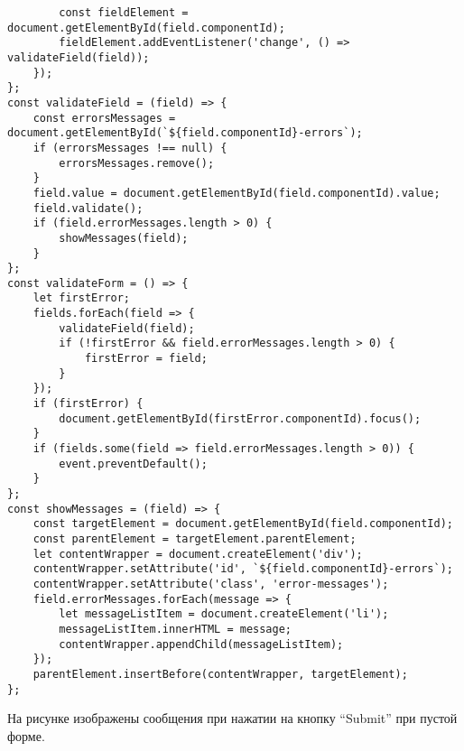 \documentclass[a4paper,14pt]{extarticle}
\begin{document}
\begin{lstlisting}
        const fieldElement = document.getElementById(field.componentId);
        fieldElement.addEventListener('change', () => validateField(field));
    });
};
const validateField = (field) => {
    const errorsMessages = document.getElementById(`${field.componentId}-errors`);
    if (errorsMessages !== null) {
        errorsMessages.remove();
    }
    field.value = document.getElementById(field.componentId).value;
    field.validate();
    if (field.errorMessages.length > 0) {
        showMessages(field);
    }
};
const validateForm = () => {
    let firstError;
    fields.forEach(field => {
        validateField(field);
        if (!firstError && field.errorMessages.length > 0) {
            firstError = field;
        }
    });
    if (firstError) {
        document.getElementById(firstError.componentId).focus();
    }
    if (fields.some(field => field.errorMessages.length > 0)) {
        event.preventDefault();
    }
};
const showMessages = (field) => {
    const targetElement = document.getElementById(field.componentId);
    const parentElement = targetElement.parentElement;
    let contentWrapper = document.createElement('div');
    contentWrapper.setAttribute('id', `${field.componentId}-errors`);
    contentWrapper.setAttribute('class', 'error-messages');
    field.errorMessages.forEach(message => {
        let messageListItem = document.createElement('li');
        messageListItem.innerHTML = message;
        contentWrapper.appendChild(messageListItem);
    });
    parentElement.insertBefore(contentWrapper, targetElement);
};
\end{lstlisting}

На рисунке изображены сообщения при нажатии на кнопку \enquote{Submit}
при пустой форме.
\begin{figure}[H]
    \centering
    
    \caption{}
    \label{}
\end{figure}
\end{document}
